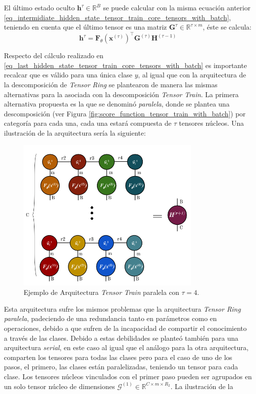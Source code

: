 \documentclass[spanish]{article}
\theoremstyle{definition}
\theoremstyle{remark}
\numberwithin{equation}{section}
\numberwithin{equation}{section} %
\begin{document}
El último estado oculto $\boldsymbol{h}^{\tau} \in \mathbb{R}^{B}$ se puede calcular con la misma ecuación anterior \eqref{eq_intermidiate_hidden_state_tensor_train_core_tensors_with_batch}, teniendo en cuenta que el último tensor es una matriz $\boldsymbol{G}^{\tau} \in \mathbb{R}^{\tau \times m}$, éste se calcula:
\begin{equation}
\label{eq_last_hidden_state_tensor_train_core_tensors_with_batch}
\boldsymbol{h}^{\tau}  = \boldsymbol{F}_\theta(\boldsymbol{x}^{(\tau)})^\intercal \boldsymbol{G}^{(\tau)}  \boldsymbol{H}^{(\tau-1)} 
\end{equation} \par
 Respecto del cálculo realizado en \eqref{eq_last_hidden_state_tensor_train_core_tensors_with_batch} es importante recalcar que es válido para una única clase $y$, al igual que con la arquitectura de la descomposición de \textit{Tensor Ring} se plantearon de manera las mismas alternativas para la asociada con la descomposición \textit{Tensor Train}. La primera alternativa propuesta es la que se denominó \textit{paralela}, donde se plantea una descomposición (ver Figura \ref{fig:score_function_tensor_train_with_batch}) por categoría para cada una, cada una estará compuesta de $\tau$ tensores núcleos. Una ilustración de la arquitectura sería la siguiente:
\begin{figure}[H]
 \centering
 \includegraphics[width=9cm]{img/ejemplo_arquitectura_paralelizada_tensor_train.png}
\caption[Arquitectura \textit{Tensor Train} paralela]{\footnotesize{Ejemplo de Arquitectura \textit{Tensor Train} paralela} con $\tau=4$.}
\label{fig:arquitecture_parallelized_tensor_train}
\end{figure}\par
 Esta arquitectura sufre los mismos problemas que la arquitectura \textit{Tensor Ring} \textit{paralela}, padeciendo de una redundancia tanto en parámetros como en operaciones, debido a que sufren de la incapacidad de compartir el conocimiento a través de las clases. Debido a estas debilidades se planteó también para una arquitectura \textit{serial}, en este caso al igual que el análogo para la otra arquitectura, comparten los tensores para todas las clases pero para el caso de uno de los pasos, el primero, las clases están paralelizadas, teniendo un tensor para cada clase. Los tensores núcleos vinculados con el primer paso pueden ser agrupados en un solo tensor núcleo de dimensiones $\mathcal{G}^{(1)} \in \mathbb{R}^{C  \times m \times R_2}$. La ilustración de la
\end{document}
